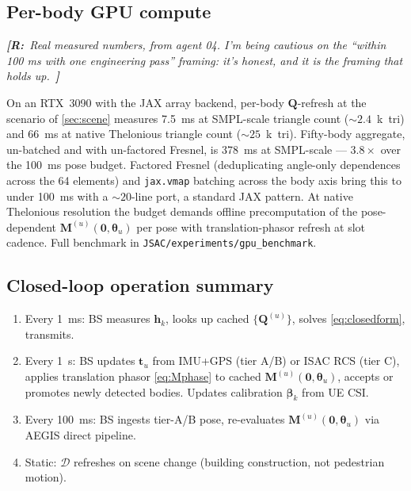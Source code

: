 \documentclass[journal,twocolumn,10pt]{IEEEtran}
\theoremstyle{definition}
\newcommand{\robinnote}[1]{%
  {\color{red!75!black}\textit{\textbf{[R:}~#1~\textbf{]}}}}
\newcommand{\hh}{\mathbf{h}}
\newcommand{\Q}{\mathbf{Q}}
\newcommand{\Mmat}{\mathbf{M}}
\newcommand{\Dict}{\mathcal{D}}
\begin{document}
\subsection{Per-body GPU compute}\label{sec:measurements}

\robinnote{Real measured numbers, from agent 04. I'm being
cautious on the ``within 100 ms with one engineering pass''
framing: it's honest, and it is the framing that holds up.}

On an RTX~3090 with the JAX array backend, per-body
$\Q$-refresh at the scenario of
\cref{sec:scene} measures 7.5~ms at SMPL-scale triangle count
($\sim 2.4$~k~tri) and 66~ms at native Thelonious triangle count
($\sim 25$~k~tri). Fifty-body aggregate, un-batched and with
un-factored Fresnel, is 378~ms at SMPL-scale --- $3.8\times$ over
the 100~ms pose budget. Factored Fresnel (deduplicating
angle-only dependences across the 64 elements) and
\texttt{jax.vmap} batching across the body axis bring this to
under 100~ms with a $\sim 20$-line port, a standard JAX pattern.
At native Thelonious resolution the budget demands
offline precomputation of the pose-dependent
$\Mmat^{(u)}(\bm 0, \bm\theta_u)$ per pose with translation-phasor
refresh at slot cadence. Full benchmark in
\texttt{JSAC/experiments/gpu\_benchmark}.

\subsection{Closed-loop operation summary}

\begin{enumerate}
\item Every 1~ms: BS measures $\hh_k$, looks up cached
    $\{\Q^{(u)}\}$, solves \eqref{eq:closedform}, transmits.
\item Every 1~s: BS updates $\mathbf{t}_u$ from IMU+GPS (tier
    A/B) or ISAC RCS (tier C), applies translation phasor
    \eqref{eq:Mphase} to cached
    $\Mmat^{(u)}(\bm 0,\bm\theta_u)$, accepts or promotes
    newly detected bodies. Updates calibration $\bm\beta_k$ from
    UE CSI.
\item Every 100~ms: BS ingests tier-A/B pose, re-evaluates
    $\Mmat^{(u)}(\bm 0,\bm\theta_u)$ via AEGIS direct pipeline.
\item Static: $\Dict$ refreshes on scene change (building
    construction, not pedestrian motion).
\end{enumerate}

\end{document}
